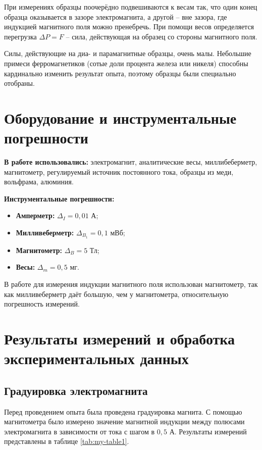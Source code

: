 \documentclass[a4paper,12pt]{article} %
\begin{document}
При измерениях образцы поочерёдно подвешиваются к весам так, что один конец образца оказывается в зазоре электромагнита, а другой -- вне зазора, где индукцией магнитного поля можно пренебречь. При помощи весов определяется перегрузка $ \Delta P = F $ -- сила, действующая на образец со стороны магнитного поля.


Силы, действующие на диа- и парамагнитные образцы, очень малы. Небольшие примеси ферромагнетиков (сотые доли процента железа или никеля) способны кардинально изменить результат опыта, поэтому образцы были специально отобраны.

\section{Оборудование и инструментальные погрешности}

\textbf{В работе использовались:} электромагнит, аналитические весы, миллибеберметр, магнитометр, регулируемый источник постоянного тока, образцы из меди, вольфрама, алюминия.

\textbf{Инструментальные погрешности:}
\begin{itemize}
    \item \textbf{Амперметр:} $\Delta_I = 0,01$ А;
    \item \textbf{Милливеберметр:} $\Delta_{B_1} = 0,1$ мВб;
    \item \textbf{Магнитометр:} $\Delta_{B} = 5$ Тл;
    \item \textbf{Весы:} $\Delta_m = 0,5$ мг.
\end{itemize}

В работе для измерения индукции магнитного поля использован магнитометр, так как милливеберметр даёт большую, чем у магнитометра, относительную погрешность измерений. 

\section{Результаты измерений и обработка экспериментальных данных}

\subsection{Градуировка электромагнита}

Перед проведением опыта была проведена градуировка магнита. С помощью магнитометра было измерено значение магнитной индукции между полюсами электромагнита в зависимости от тока с шагом в $ 0,5 $ А. Результаты измерений представлены в таблице \ref{tab:my-table1}.
\end{document}
